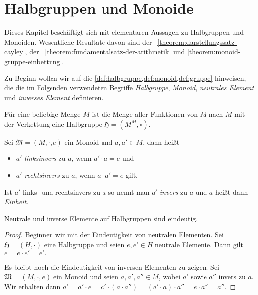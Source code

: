 \section{Halbgruppen und Monoide}
Dieses Kapitel beschäftigt sich mit elementaren Aussagen zu Halbgruppen und Monoiden. Wesentliche Resultate davon sind der ~\ref{theorem:darstellungssatz-cayley}, der ~\ref{theorem:fundamentalsatz-der-arithmetik} und \cref{theorem:monoid-gruppe-einbettung}.

Zu Beginn wollen wir auf die \cref{def:halbgruppe,def:monoid,def:gruppe} hinweisen, die die im Folgenden verwendeten Begriffe \emph{Halbgruppe}, \emph{Monoid}, \emph{neutrales Element} und \emph{inverses Element} definieren.

\begin{example}
    Für eine beliebige Menge $M$ ist die Menge aller Funktionen von $M$ nach $M$ mit der Verkettung eine Halbgruppe $\mathfrak{H} = (M^M, \circ)$.
\end{example}

\begin{definition}
    Sei $\mathfrak{M} = (M, \cdot, e)$ ein Monoid und $a, a' \in M$, dann heißt
    \begin{itemize}[topsep=0pt, label={--}]
        \item $a'$ \emph{linksinvers} zu $a$, wenn $a' \cdot a = e$ und
        \item $a'$ \emph{rechtsinvers} zu $a$, wenn $a \cdot a' = e$ gilt.
    \end{itemize}
    Ist $a'$ links- und rechtsinvers zu $a$ so nennt man $a'$ \emph{invers} zu $a$ und $a$ heißt dann \emph{Einheit}.
\end{definition}

\begin{lemma}
    Neutrale und inverse Elemente auf Halbgruppen sind eindeutig.
\end{lemma}
\begin{proof}
    Beginnen wir mit der Eindeutigkeit von neutralen Elementen. Sei $\mathfrak{H} = (H, \cdot)$ eine Halbgruppe und seien $e, e' \in H$ neutrale Elemente. Dann gilt $e = e \cdot e' = e'.$
    
    Es bleibt noch die Eindeutigkeit von inversen Elementen zu zeigen. Sei $\mathfrak{M} = (M, \cdot, e)$ ein Monoid und seien $a, a', a'' \in M$, wobei $a'$ sowie $a''$ invers zu $a$. Wir erhalten dann $ a' = a' \cdot e = a' \cdot (a \cdot a'') = (a' \cdot a) \cdot a'' = e \cdot a'' = a''.$
\end{proof}

